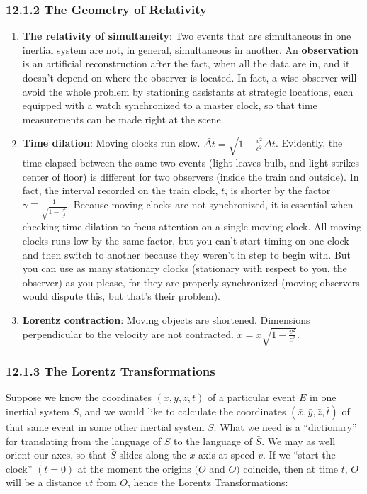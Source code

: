 \documentclass[12pt]{book}
\begin{document}
\subsubsection{\textbf{12.1.2 The Geometry of Relativity}}
    \begin{enumerate}
        \item \textbf{The relativity of simultaneity}: Two events that are simultaneous in one inertial system are not, in general, simultaneous in another. An \textbf{observation} is an artificial reconstruction after the fact, when all the data are in, and it doesn’t depend on where the observer is located. In fact, a wise observer will avoid the whole problem by stationing assistants at strategic locations, each equipped with a watch synchronized to a master clock, so that time measurements can be made right at the scene.
        \item \textbf{Time dilation}: Moving clocks run slow. $\bar{\Delta t} = \sqrt{1 - \frac{v^2}{c^2}}\Delta t$. Evidently, the time elapsed between the same two events (light leaves bulb, and light strikes center of floor) is different for two observers (inside the train and outside). In fact, the interval recorded on the train clock, $\bar{t}$, is shorter by the factor $\gamma \equiv \frac{1}{\sqrt{1 - \frac{v^2}{c^2}}}$. 
        Because moving clocks are not synchronized, it is essential when checking time dilation to focus attention on a single moving clock. All moving clocks runs low by the same factor, but you can’t start timing on one clock and then switch to another because they weren’t in step to begin with. But you can use as many stationary clocks (stationary with respect to you, the observer) as you please, for
        they are properly synchronized (moving observers would dispute this, but that’s their problem).
        \item \textbf{Lorentz contraction}: Moving objects are shortened. Dimensions perpendicular to the velocity are not contracted. $\bar{x} = x \sqrt{1 - \frac{v^2}{c^2}}$.
    \end{enumerate}
\subsubsection{\textbf{12.1.3 The Lorentz Transformations}}
Suppose we know the coordinates $(x, y, z, t)$ of a particular event $E$ in one inertial system $S$, and we would like to calculate the coordinates $(\bar{x}, \bar{y}, \bar{z}, \bar{t})$ of that same event in some other inertial system $\bar{S}$. What we need is a “dictionary” for translating from the language of $S$ to the language of $\bar{S}$. We may as well orient our axes, so that $\bar{S}$ slides along the $x$ axis at speed $v$. If we “start the clock” $(t = 0)$ at the moment the origins $(O $ and $ \bar{O})$ coincide, then at time $t$, $\bar{O}$ will be a distance $vt$ from $O$, hence the Lorentz Transformations:
\end{document}
